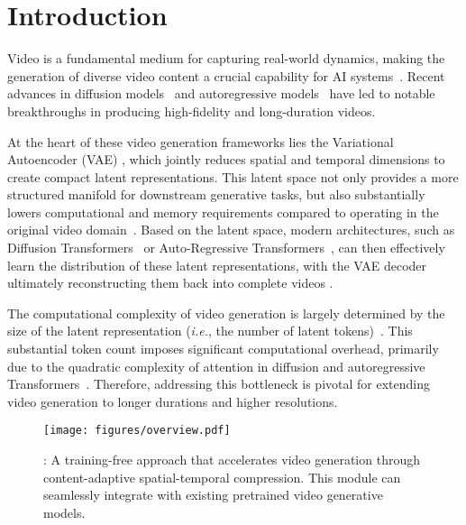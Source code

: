 \section{Introduction}


Video is a fundamental medium for capturing real-world dynamics, making the generation of diverse video content a crucial capability for AI systems~\cite{videoworldsimulators2024,agarwal2025cosmos}. 
Recent advances in diffusion models~\cite{ho2020denoising,rombach2022high,esser2024scaling,jin2024pyramidal} and autoregressive models~\cite{kuaishou2024,fan2024fluid} have led to notable breakthroughs in producing high-fidelity and long-duration videos.

At the heart of these video generation frameworks lies the Variational Autoencoder (VAE) \cite{kingma2013auto,rombach2022high,xing2024large}, which jointly reduces spatial and temporal dimensions to create compact latent representations. 
This latent space not only provides a more structured manifold for downstream generative tasks, but also substantially lowers computational and memory requirements compared to operating in the original video domain~\cite{agarwal2025cosmos,videoworldsimulators2024}. Based on the latent space, modern architectures, such as Diffusion Transformers~\cite{peebles2023scalable} or Auto-Regressive Transformers~\cite{esser2021taming}, can then effectively learn the distribution of these latent representations, with the VAE decoder ultimately reconstructing them back into complete videos \cite{jin2024pyramidal,kuaishou2024,kong2024hunyuanvideo}.

The computational complexity of video generation is largely determined by the size of the latent representation (\textit{i.e.}, the number of latent tokens)~\cite{kong2024hunyuanvideo,zheng2024open,kondratyuk2023videopoet}. 
This substantial token count imposes significant computational overhead, primarily due to the quadratic complexity of attention in diffusion and autoregressive Transformers~\cite{vaswani2017attention,kondratyuk2023videopoet,peebles2023scalable}. Therefore, addressing this bottleneck is pivotal for extending video generation to longer durations and higher resolutions. 

\begin{figure}[!t]
    \centering
    \texttt{[image: figures/overview.pdf]}    
    \vspace{-0.2in}
    \caption{\textbf{\dlfr}: A training-free approach that accelerates video generation through content-adaptive spatial-temporal compression. This module can seamlessly integrate with existing pretrained video generative models.}
    \vspace{-0.3in}
    \label{fig:intro}
\end{figure}


